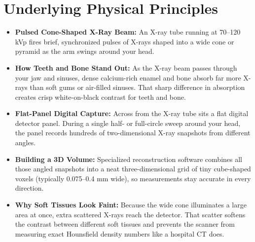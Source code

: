 \section{Underlying Physical Principles}
\begin{itemize}
    \item \textbf{Pulsed Cone-Shaped X-Ray Beam:} An X-ray tube running at 70--120 kVp fires brief, synchronized pulses of X-rays shaped into a wide cone or pyramid as the arm swings around your head.
    \item \textbf{How Teeth and Bone Stand Out:} As the X-ray beam passes through your jaw and sinuses, dense calcium-rich enamel and bone absorb far more X-rays than soft gums or air-filled sinuses. That sharp difference in absorption creates crisp white-on-black contrast for teeth and bone.
    \item \textbf{Flat-Panel Digital Capture:} Across from the X-ray tube sits a flat digital detector panel. During a single half- or full-circle sweep around your head, the panel records hundreds of two-dimensional X-ray snapshots from different angles.
    \item \textbf{Building a 3D Volume:} Specialized reconstruction software combines all those angled snapshots into a neat three-dimensional grid of tiny cube-shaped voxels (typically 0.075--0.4 mm wide), so measurements stay accurate in every direction.
    \item \textbf{Why Soft Tissues Look Faint:} Because the wide cone illuminates a large area at once, extra scattered X-rays reach the detector. That scatter softens the contrast between different soft tissues and prevents the scanner from measuring exact Hounsfield density numbers like a hospital CT does.
\end{itemize}

